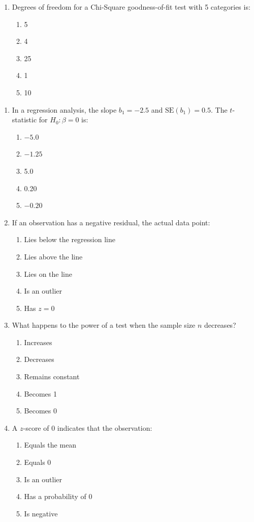 \begin{enumerate}[leftmargin=1.5em]
  \item Degrees of freedom for a Chi-Square goodness-of-fit test with 5 categories is:
  \begin{enumerate}[label=(\Alph*)]
    \item 5 \item 4 \item 25 \item 1 \item 10
  \end{enumerate}
\end{enumerate}

\begin{enumerate}[resume, leftmargin=1.5em]
  \item In a regression analysis, the slope $b_1 = -2.5$ and $\text{SE}(b_1) = 0.5$. The $t$-statistic for $H_0: \beta = 0$ is:
  \begin{enumerate}[label=(\Alph*)]
    \item $-5.0$ \item $-1.25$ \item 5.0 \item 0.20 \item $-0.20$
  \end{enumerate}

  \item If an observation has a negative residual, the actual data point:
  \begin{enumerate}[label=(\Alph*)]
    \item Lies below the regression line \item Lies above the line \item Lies on the line \item Is an outlier \item Has $z = 0$
  \end{enumerate}

  \item What happens to the power of a test when the sample size $n$ decreases?
  \begin{enumerate}[label=(\Alph*)]
    \item Increases \item Decreases \item Remains constant \item Becomes 1 \item Becomes 0
  \end{enumerate}

  \item A $z$-score of 0 indicates that the observation:
  \begin{enumerate}[label=(\Alph*)]
    \item Equals the mean \item Equals 0 \item Is an outlier \item Has a probability of 0 \item Is negative
  \end{enumerate}


\end{enumerate}
